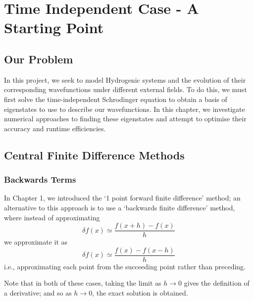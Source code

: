 \chapter{Time Independent Case - A Starting Point} %

\label{Chapter2} %

\section{Our Problem}
In this project, we seek to model Hydrogenic systems and the evolution of their corresponding wavefunctions under different external fields. To do this, we must first solve the time-independent Schrodinger equation to obtain a basis of eigenstates to use to describe our wavefunctions. In this chapter, we investigate numerical approaches to finding these eigenstates and attempt to optimise their accuracy and runtime efficiencies.

\section{Central Finite Difference Methods}
\subsection{Backwards Terms}
In Chapter 1, we introduced the `1 point forward finite difference' method; an alternative to this approach is to use a `backwards finite difference' method, where instead of approximating 
\begin{equation*}
    \delta f\left(x\right) \simeq \frac{f\left(x + h\right) - f\left(x\right)}{h}
\end{equation*}
we approximate it as 
\begin{equation*}
    \delta f\left(x\right) \simeq \frac{f\left(x\right) - f\left(x - h\right)}{h}
\end{equation*}
i.e., approximating each point from the succeeding point rather than preceding. 

Note that in both of these cases, taking the limit as $h\rightarrow 0$ gives the definition of a derivative; and so as $h\rightarrow 0$, the exact solution is obtained.


